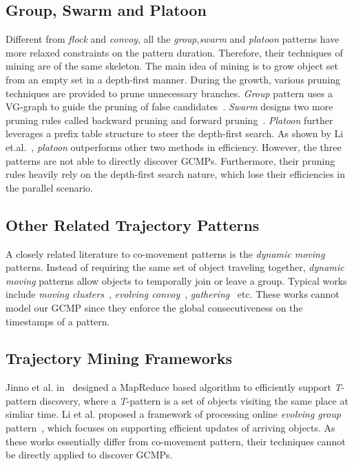 \subsection{Group, Swarm and Platoon}
Different from \emph{flock} and \emph{convoy}, all the \emph{group},\emph{swarm} and \emph{platoon}
patterns have more relaxed constraints on the pattern duration. Therefore, their techniques of mining are of
the same skeleton. The main idea of mining is to grow object set from an empty set
in a depth-first manner. During the growth, various pruning techniques are provided to prune 
unnecessary branches. \emph{Group} pattern uses a VG-graph to guide the pruning of false candidates~\cite{wang2006grouppattern}.
\emph{Swarm} designs two more pruning rules called backward pruning and forward pruning~\cite{li2010swarm}. \emph{Platoon}
further leverages a prefix table structure to steer the depth-first search. As shown by Li et.al.~\cite{li2015platoon},
\emph{platoon} outperforms other two methods in efficiency. 
However, the three patterns are not able to directly discover GCMPs.
Furthermore, their pruning rules heavily rely on the depth-first search nature, which lose their efficiencies
in the parallel scenario.

\subsection{Other Related Trajectory Patterns}
A closely related literature to co-movement patterns is the \emph{dynamic moving} patterns. Instead of requiring the same set of object traveling together, \emph{dynamic moving} patterns allow objects to temporally join or leave a group. Typical works include \emph{moving clusters}~\cite{kalnis2005movingclusters}, \emph{evolving convoy}~\cite{aung2010discovery}, \emph{gathering}~\cite{zheng2013gathering} etc. These works cannot model our GCMP since they enforce the global consecutiveness on the timestamps of a pattern. 

\subsection{Trajectory Mining Frameworks}
Jinno et al. in~\cite{jinno2012paralleltpattern} designed a MapReduce based algorithm to efficiently support \emph{T}-pattern discovery, where a \emph{T}-pattern is a set of objects visiting the same place at simliar time. Li et al. proposed a framework of processing online \emph{evolving group} pattern~\cite{li2013onlinegroup}, which focuses on supporting efficient updates of arriving objects. 
As these works essentially differ from co-movement pattern, their techniques cannot be directly applied to discover GCMPs.
